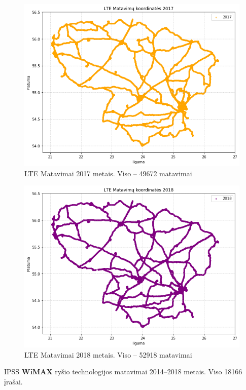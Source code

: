 \documentclass{VUMIFPSbakalaurinis}
\begin{document}
\begin{figure}[H]
	\centering
	\includegraphics[scale=0.5]{img/LTE-4}
	\caption{LTE Matavimai 2017 metais. Viso – 49672 matavimai}
	\label{img:LTE-4}
\end{figure}
\begin{figure}[H]
	\centering
	\includegraphics[scale=0.5]{img/LTE-5}
	\caption{LTE Matavimai 2018 metais. Viso – 52918 matavimai}
	\label{img:LTE-5}
\end{figure}
IPSS \textbf{WiMAX} ryšio technologijos matavimai 2014–2018 metais. Viso 18166 įrašai.
\end{document}
